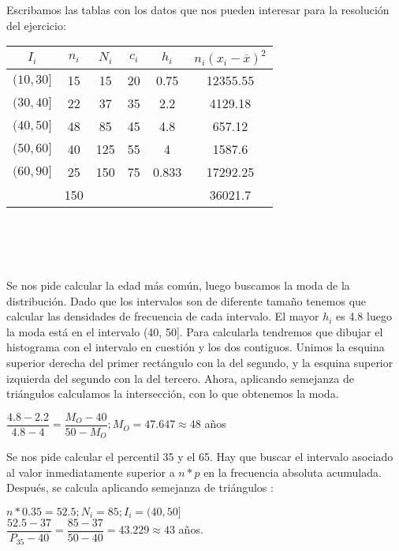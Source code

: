 Escribamos las tablas con los datos que nos pueden interesar para la resolución del ejercicio: \\

\begin{tabular}{| c | c | c | c | c | c |}
	\hline
	$I_i$   & $n_i$ &$N_i$&$c_i$&$h_i$ & $n_i(x_i-\overline{x})^2$ \\ \hline
	$(10, 30]$ & 15 & 15  & 20  & 0.75 & 12355.55\\
	$(30, 40]$ & 22 & 37  & 35  & 2.2  & 4129.18 \\
	$(40, 50]$ & 48 & 85  & 45  & 4.8  & 657.12  \\
	$(50, 60]$ & 40 & 125 & 55  & 4    & 1587.6  \\
	$(60, 90]$ & 25 & 150 & 75  & 0.833& 17292.25\\ \hline
	           & 150&     &     &      & 36021.7 \\ \hline
	
\end{tabular} \\\\\\

\subproblem

Se nos pide calcular la edad más común, luego buscamos la moda de la distribución. Dado que los intervalos son de diferente tamaño tenemos que calcular las densidades de frecuencia de cada intervalo. El mayor $h_i$ es 4.8 luego la moda está en el intervalo (40, 50]. Para calcularla tendremos que dibujar el histograma con el intervalo en cuestión y los dos contiguos. Unimos la esquina superior derecha del primer rectángulo con la del segundo, y la esquina superior izquierda del segundo con la del tercero. Ahora, aplicando semejanza de triángulos calculamos la intersección, con lo que obtenemos la moda.
\begin{center}
	$\dfrac{4.8-2.2}{4.8-4} = \dfrac{M_O-40}{50-M_O}; M_O = 47.647 \approx 48$ años
\end{center}


\subproblem

Se nos pide calcular el percentil 35 y el 65. Hay que buscar el intervalo asociado al valor inmediatamente superior a $n*p$ en la frecuencia absoluta acumulada. Después, se calcula aplicando semejanza de triángulos : \\


\begin{center}
	$n*0.35 = 52.5; N_i = 85; I_i = (40, 50]$\\
	$\dfrac{52.5-37}{P_{35}-40} = \dfrac{85-37}{50-40} = 43.229
	\approx 43$ años.
\end{center}

